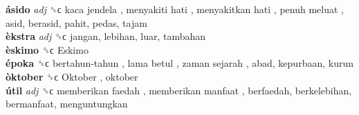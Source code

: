 \textbf{ásido} \emph{adj}  ␝ϲ   kaca jendela ,  menyakiti hati ,  menyakitkan hati ,  penuh meluat , asid, berasid, pahit, pedas, tajam  \\
\textbf{èkstra} \emph{adj}  ␝ϲ  jangan, lebihan, luar, tambahan  \\
\textbf{èskimo} ␝ϲ   Eskimo   \\
\textbf{époka} ␝ϲ   bertahun-tahun ,  lama betul ,  zaman sejarah , abad, kepurbaan, kurun  \\
\textbf{òktober} ␝ϲ   Oktober , oktober  \\
\textbf{útil} \emph{adj}  ␝ϲ   memberikan faedah ,  memberikan manfaat , berfaedah, berkelebihan, bermanfaat, menguntungkan  \\
